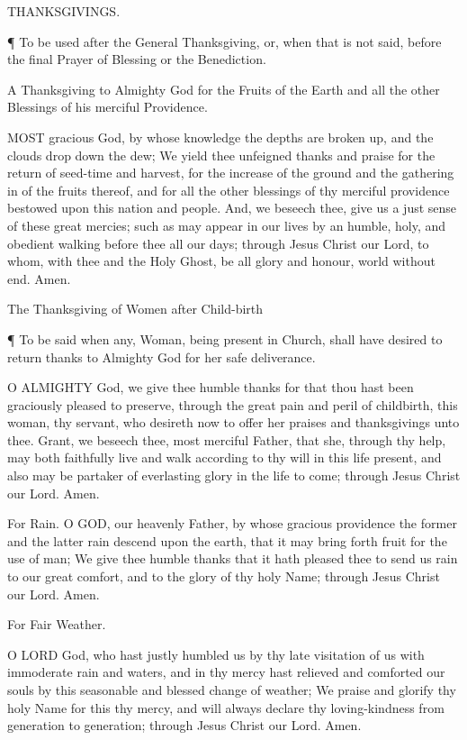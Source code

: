  

 
THANKSGIVINGS.

¶ To be used after the General Thanksgiving, or, when that is not said, before the final Prayer of Blessing or the Benediction.

A Thanksgiving to Almighty God for the Fruits of the Earth and all the other Blessings of his merciful Providence.
 

MOST gracious God, by whose knowledge the depths are broken up, and the clouds drop down the dew; We yield thee unfeigned thanks and praise for the return of seed-time and harvest, for the increase of the ground and the gathering in of the fruits thereof, and for all the other blessings of thy merciful providence bestowed upon this nation and people. And, we beseech thee, give us a just sense of these great mercies; such as may appear in our lives by an humble, holy, and obedient walking before thee all our days; through Jesus Christ our Lord, to whom, with thee and the Holy Ghost, be all glory and honour, world without end. Amen.

The Thanksgiving of Women after Child-birth

¶ To be said when any, Woman, being present in Church, shall have desired to return thanks to Almighty God for her safe deliverance.

O ALMIGHTY God, we give thee humble thanks for that thou hast been graciously pleased to preserve, through the great pain and peril of childbirth, this woman, thy servant, who desireth now to offer her praises and thanksgivings unto thee. Grant, we beseech thee, most merciful Father, that she, through thy help, may both faithfully live and walk according to thy will in this life present, and also may be partaker of everlasting glory in the life to come; through Jesus Christ our Lord. Amen.
 

For Rain.
O GOD, our heavenly Father, by whose gracious providence the former and the latter rain descend upon the earth, that it may bring forth fruit for the use of man; We give thee humble thanks that it hath pleased thee to send us rain to our great comfort, and to the glory of thy holy Name; through Jesus Christ our Lord. Amen.
 

 
 
For Fair Weather.

O LORD God, who hast justly humbled us by thy late visitation of us with immoderate rain and waters, and in thy mercy hast relieved and comforted our souls by this seasonable and blessed change of weather; We praise and glorify thy holy Name for this thy mercy, and will always declare thy loving-kindness from generation to generation; through Jesus Christ our Lord. Amen.

